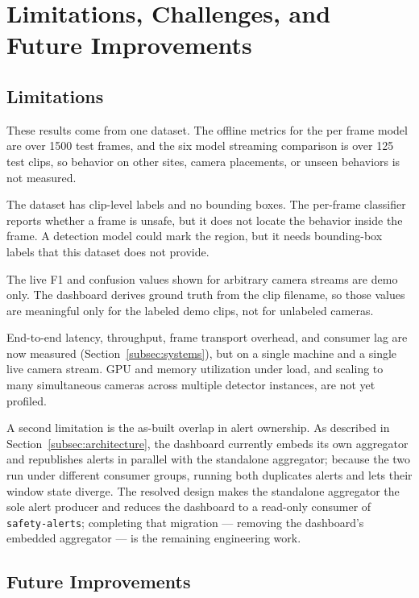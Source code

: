 \documentclass[conference]{IEEEtran}
\begin{document}
\section{Limitations, Challenges, and Future Improvements}
\label{sec:limitations}

\subsection{Limitations}

These results come from one dataset. The offline metrics for the
per frame model are over 1500 test frames, and the six model streaming
comparison is over 125 test clips, so behavior on other sites, camera
placements, or unseen behaviors is not measured.

The dataset has clip-level labels and no bounding boxes. The per-frame
classifier reports whether a frame is unsafe, but it does not locate the
behavior inside the frame. A detection model could mark the region, but
it needs bounding-box labels that this dataset does not provide.

The live F1 and confusion values shown for arbitrary camera streams are
demo only. The dashboard derives ground truth from the clip filename, so
those values are meaningful only for the labeled demo clips, not for
unlabeled cameras.

End-to-end latency, throughput, frame transport overhead, and consumer lag
are now measured (Section~\ref{subsec:systems}), but on a single machine and a
single live camera stream. GPU and memory utilization under load, and scaling to
many simultaneous cameras across multiple detector instances, are not yet
profiled.

A second limitation is the as-built overlap in alert ownership. As described in
Section~\ref{subsec:architecture}, the dashboard currently embeds its own
aggregator and republishes alerts in parallel with the standalone aggregator;
because the two run under different consumer groups, running both duplicates
alerts and lets their window state diverge. The resolved design makes the
standalone aggregator the sole alert producer and reduces the dashboard to a
read-only consumer of \texttt{safety-alerts}; completing that migration --- removing
the dashboard's embedded aggregator --- is the remaining engineering work.

\subsection{Future Improvements}
\end{document}
